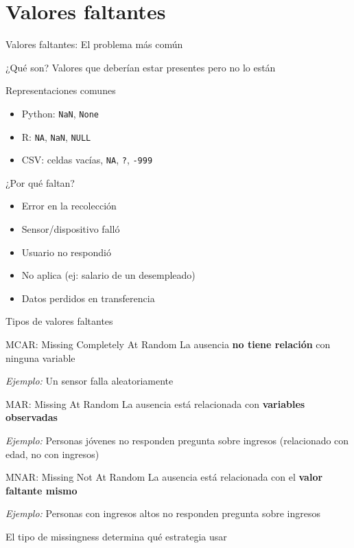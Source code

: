 \documentclass[aspectratio=169]{beamer}
\begin{document}
\section{Valores faltantes}

\begin{frame}{Valores faltantes: El problema más común}
\begin{block}{¿Qué son?}
Valores que deberían estar presentes pero no lo están
\end{block}

\begin{block}{Representaciones comunes}
\begin{itemize}
    \item Python: \texttt{NaN}, \texttt{None}
    \item R: \texttt{NA}, \texttt{NaN}, \texttt{NULL}
    \item CSV: celdas vacías, \texttt{NA}, \texttt{?}, \texttt{-999}
\end{itemize}
\end{block}

\pause

\begin{alertblock}{¿Por qué faltan?}
\begin{itemize}
    \item Error en la recolección
    \item Sensor/dispositivo falló
    \item Usuario no respondió
    \item No aplica (ej: salario de un desempleado)
    \item Datos perdidos en transferencia
\end{itemize}
\end{alertblock}
\end{frame}

\begin{frame}{Tipos de valores faltantes}
\begin{block}{MCAR: Missing Completely At Random}
La ausencia \textbf{no tiene relación} con ninguna variable

\textit{Ejemplo:} Un sensor falla aleatoriamente
\end{block}

\pause

\begin{block}{MAR: Missing At Random}
La ausencia está relacionada con \textbf{variables observadas}

\textit{Ejemplo:} Personas jóvenes no responden pregunta sobre ingresos (relacionado con edad, no con ingresos)
\end{block}

\pause

\begin{block}{MNAR: Missing Not At Random}
La ausencia está relacionada con el \textbf{valor faltante mismo}

\textit{Ejemplo:} Personas con ingresos altos no responden pregunta sobre ingresos
\end{block}

\vspace{0.5em}
\small{El tipo de missingness determina qué estrategia usar}
\end{frame}
\end{document}
